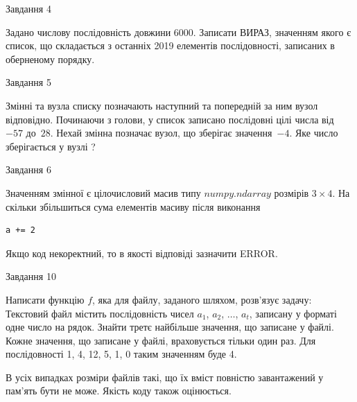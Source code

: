 \documentclass[12pt, ukrainian]{article}
\begin{document}
{               
{\begin{center}Завдання {4}\end{center}}
\vspace{-6mm}

 Задано числову послідовність  довжини 6000. Записати ВИРАЗ, значенням якого є список, що складається з останніх 2019 елементів послідовності, записаних в обернено\-му порядку.\par

\vspace{10mm}
               
{\begin{center}Завдання {5}\end{center}}
\vspace{-6mm}
Змінні  та  вузла списку позначають наступний та попередній за ним вузол відповідно. Починаючи з голови, у список записано послідовні цілі числа від~$-57$ до~$28$. Нехай змінна  позначає вузол, що зберігає значення~$-4$.
Яке число зберігається у вузлі  ?\par

               
{\begin{center}Завдання {6}\end{center}}
\vspace{-6mm}
Значенням змінної  є цілочисловий масив типу $numpy.ndarray$ розмірів $3{\times}4$. На скільки збільшиться сума елементів масиву  після виконання
\begin{verbatim}
a += 2
\end{verbatim}


Якщо код некоректний, то в якості відповіді зазначити ERROR.\par

               
{\begin{center}Завдання {10}\end{center}}
\vspace{-6mm}

Написати функцію $f$, яка для файлу, заданого шляхом, розв’язує задачу:\\ Текстовий файл містить послідовність чисел $a_1$, $a_2$, $\ldots$, $a_t$, записану у форматі одне число на рядок. Знайти третє найбільше значення, що записане у файлі. Кожне значення, що записане у файлі, враховується тільки один раз. Для послідовності 1, 4, 12, 5, 1, 0 таким значенням буде 4.

В усіх випадках розміри файлів такі, що їх вміст повністю завантажений у пам'ять бути не може. Якість коду також оцінюється.



}
\end{document}
